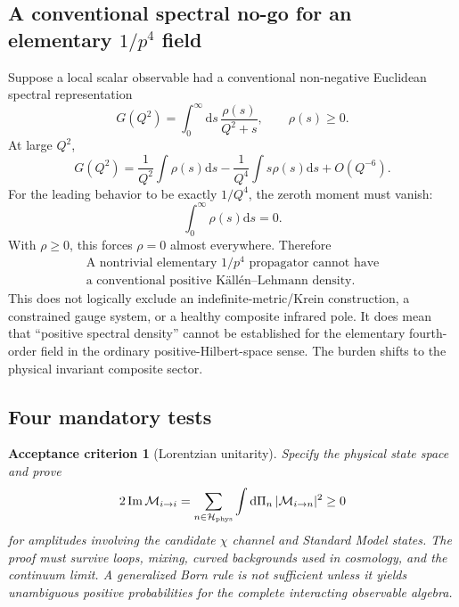 \documentclass[11pt,a4paper]{article}
\newtheorem{criterion}[definition]{Acceptance criterion}
\newcommand{\dd}{\mathrm{d}}
\newcommand{\M}{\mathcal{M}}
\begin{document}
\subsection{A conventional spectral no-go for an elementary $1/p^4$ field}

Suppose a local scalar observable had a conventional non-negative Euclidean spectral representation
\[
G(Q^2)=\int_0^\infty\dd s\,\frac{\rho(s)}{Q^2+s},
\qquad \rho(s)\ge0.
\]
At large $Q^2$,
\begin{equation}
G(Q^2)=\frac{1}{Q^2}\int\rho(s)\dd s
-\frac{1}{Q^4}\int s\rho(s)\dd s+O(Q^{-6}).
\label{eq:KLexpansion}
\end{equation}
For the leading behavior to be exactly $1/Q^4$, the zeroth moment must vanish:
\[
\int_0^\infty\rho(s)\dd s=0.
\]
With $\rho\ge0$, this forces $\rho=0$ almost everywhere. Therefore
\begin{equation}
\boxed{
\begin{gathered}
\text{A nontrivial elementary }1/p^4\text{ propagator cannot have}\\
\text{a conventional positive K\"all\'en--Lehmann density.}
\end{gathered}
}
\label{eq:p4nogo}
\end{equation}
This does not logically exclude an indefinite-metric/Krein construction, a constrained gauge system, or a healthy composite infrared pole. It does mean that ``positive spectral density'' cannot be established for the elementary fourth-order field in the ordinary positive-Hilbert-space sense. The burden shifts to the physical invariant composite sector.

\subsection{Four mandatory tests}

\begin{criterion}[Lorentzian unitarity]
Specify the physical state space and prove
\begin{equation}
2\,\mathrm{Im}\,\M_{i\to i}
=
\sum_{n\in\mathcal H_{\rm phys}}
\int\dd\Pi_n\,|\M_{i\to n}|^2
\ge0
\label{eq:optical}
\end{equation}
for amplitudes involving the candidate $\chi$ channel and Standard Model states. The proof must survive loops, mixing, curved backgrounds used in cosmology, and the continuum limit. A generalized Born rule is not sufficient unless it yields unambiguous positive probabilities for the complete interacting observable algebra.
\end{criterion}
\end{document}
